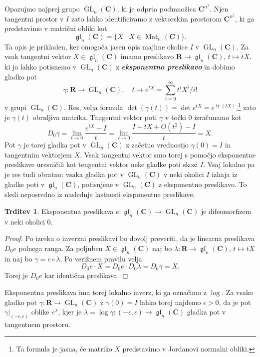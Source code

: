 \documentclass[11pt]{book}
\def\RR{\mathbf{R}}
\def\CC{\mathbf{C}}
\DeclareMathOperator\tr{tr}
\DeclareMathOperator\GL{GL}
\DeclareMathOperator\glfrak{\mathfrak{gl}}
\DeclareMathOperator\Mat{Mat}
\def\definicija{\color{rdeca}\bf\em}
\theoremstyle{definition}
\theoremstyle{zgled}
\theoremstyle{odprtproblem}
\theoremstyle{domacanaloga}
\newenvironment{dokaz}
    {\color{siva}\begin{proof}}
    {\end{proof}}
\theoremstyle{izrek}
\newtheorem*{trditev}{Trditev}
\begin{document}
Opazujmo najprej grupo $\GL_n(\CC)$, ki je odprta podmnožica $\CC^{n^2}$. Njen tangentni prostor v $I$ zato lahko identificiramo z vektorskim prostorom $\CC^{n^2}$, ki ga predstavimo v matrični obliki kot
\[
    \textstyle \glfrak_n(\CC) = \{ X \mid X \in \Mat_{n}(\CC) \}.
\]
Ta opis je prikladen, ker omogoča jasen opis majhne okolice $I$ v $\GL_n(\CC)$. Za vsak tangentni vektor $X \in \glfrak_n(\CC)$ imamo preslikavo $\RR \to \glfrak_n(\CC)$, $t \mapsto tX$, ki jo lahko potisnemo v $\GL_n(\CC)$ z {\definicija eksponentno preslikavo} in dobimo gladko pot
\[
    \gamma \colon \RR \to {\textstyle \GL_n(\CC)}, \quad
    t \mapsto e^{tX} = \sum_{i = 0}^{\infty} t^i X^i / i!
\]
v grupi $\GL_n(\CC)$. Res, velja formula $\det(\gamma(t)) = \det e^{tX} = e^{\tr (tX)}$,\footnote{Ta formula je jasna, če matriko $X$ predstavimo v Jordanovi normalni obliki.} zato je $\gamma(t)$ obrnljiva matrika. Tangentni vektor poti $\gamma$ v točki $0$ izračunamo kot
\[
    D_0 \gamma 
    = \lim_{t \to 0} \frac{e^{tX} - I}{t}
    = \lim_{t \to 0} \frac{I + tX + O(t^2) - I}{t}
    = X.
\]
Pot $\gamma$ je torej gladka pot v $\GL_n(\CC)$ z začetno vrednostjo $\gamma(0) = I$ in tangentnim vektorjem $X$. Vsak tangentni vektor smo torej s pomočjo eksponentne preslikave uresničili kot tengentni vektor neke gladke poti skozi $I$. Vsaj lokalno pa je res tudi obratno: vsaka gladka pot v $\GL_n(\CC)$ v neki okolici $I$ izhaja iz gladke poti v $\glfrak_n(\CC)$, potisnjene v $\GL_n(\CC)$ z eksponentno preslikavo. To sledi neposredno iz naslednje lastnosti eksponentne preslikave.

\begin{trditev}
Eksponentna preslikava $e \colon \glfrak_n(\CC) \to \GL_n(\CC)$ je difeomorfizem v neki okolici $0$.
\end{trditev}
\begin{dokaz}
Po izreku o inverzni preslikavi bo dovolj preveriti, da je linearna preslikava $D_0 e$ polnega ranga. Za poljuben $X \in \glfrak_n(\CC)$ naj bo $\lambda \colon \RR \to \glfrak_n(\CC)$, $t \mapsto tX$ in naj bo $\gamma = e \circ \lambda$. Po verižnem pravilu velja
\[
    D_0 e \cdot X
    = D_0 e \cdot D_0 \lambda
    = D_0 \gamma
    = X.
\]
Torej je $D_0 e$ kar identična preslikava. 
\end{dokaz}

Eksponentna preslikava ima torej lokalno inverz, ki ga označimo z $\log$. Za vsako gladko pot $\gamma \colon \RR \to \GL_n(\CC)$ z $\gamma(0) = I$ lahko torej najdemo $\epsilon > 0$, da je pot $\gamma |_{(-\epsilon, \epsilon)}$ oblike $e^{\lambda}$, kjer je $\lambda = \log \gamma \colon (-\epsilon, \epsilon) \to \glfrak_n(\CC)$ gladka pot v tangentnem prostoru.
\end{document}
